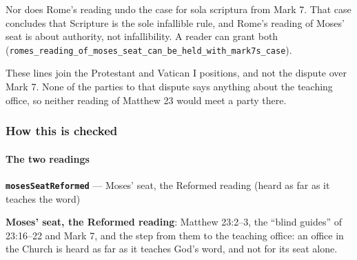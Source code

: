 \documentclass[11pt]{article}
\begin{document}
Nor does Rome’s reading undo the case for sola scriptura from Mark 7. That case concludes that Scripture is the sole infallible rule, and Rome’s reading of Moses’ seat is about authority, not infallibility. A reader can grant both (\texttt{romes\_\allowbreak{}reading\_\allowbreak{}of\_\allowbreak{}moses\_\allowbreak{}seat\_\allowbreak{}can\_\allowbreak{}be\_\allowbreak{}held\_\allowbreak{}with\_\allowbreak{}mark7s\_\allowbreak{}case}).

These lines join the Protestant and Vatican I positions, and not the dispute over Mark 7. None of the parties to that dispute says anything about the teaching office, so neither reading of Matthew 23 would meet a party there.

\subsubsection*{How this is checked}
\paragraph*{The two readings}
\leavevmode\par\nobreak
\par\medskip\noindent\textbf{\texttt{moses\allowbreak{}Seat\allowbreak{}Reformed}} --- Moses’ seat, the Reformed reading (heard as far as it teaches the word)\par\nobreak\noindent
\textbf{Moses’ seat, the Reformed reading}: Matthew 23:2–3, the “blind guides” of 23:16–22 and Mark 7, and the step from them to the teaching office: an office in the Church is heard as far as it teaches God’s word, and not for its seat alone.
\end{document}
